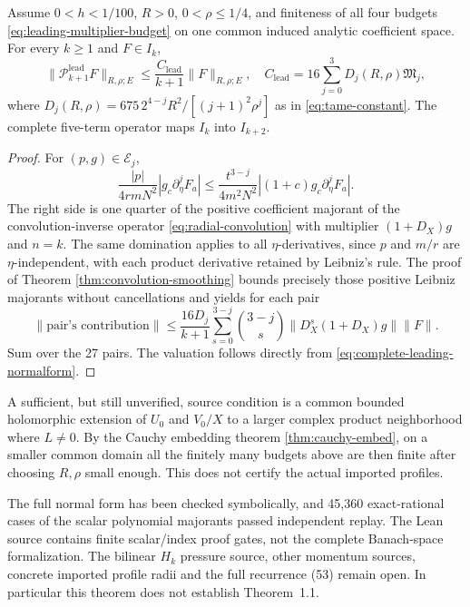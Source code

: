 \begin{theorem}
\label{thm:full-leading-pressure}
Assume $0<h<1/100$, $R>0$, $0<\rho\le1/4$,
and finiteness of all four budgets
\eqref{eq:leading-multiplier-budget} on one common induced
analytic coefficient space. For every $k\ge1$ and $F\in I_k$,
\begin{equation}\label{eq:leading-full-bound}
\|\mathcal P_{k+1}^{\mathrm{lead}}F\|_{R,\rho;E}
\le\frac{C_{\mathrm{lead}}}{k+1}\|F\|_{R,\rho;E},
\quad C_{\mathrm{lead}}=
16\sum_{j=0}^3D_j(R,\rho)\mathfrak M_j,
\end{equation}
where $D_j(R,\rho)=675\,2^{4-j}R^2/
[(j+1)^2\rho^j]$ as in \eqref{eq:tame-constant}.
The complete five-term operator maps $I_k$ into $I_{k+2}$.
\end{theorem}
\begin{proof}
For $(p,g)\in\mathcal E_j$,
\[
\frac{|p|}{4rmN^2}|g_c\partial_\eta^jF_a|
\le\frac{t^{3-j}}{4m^2N^2}
|(1+c)g_c\partial_\eta^jF_a|.
\]
The right side is one quarter of the positive coefficient
majorant of the convolution-inverse operator
\eqref{eq:radial-convolution} with multiplier
$(1+D_X)g$ and $n=k$. The same domination applies
to all $\eta$-derivatives, since $p$ and $m/r$ are
$\eta$-independent, with each product derivative retained
by Leibniz's rule. The proof of Theorem
\ref{thm:convolution-smoothing} bounds precisely those
positive Leibniz majorants without cancellations and yields
for each pair
\[
\|\text{pair's contribution}\|
\le\frac{16D_j}{k+1}
\sum_{s=0}^{3-j}\binom{3-j}{s}
\|D_X^s(1+D_X)g\|\|F\|.
\]
Sum over the 27 pairs. The valuation follows
directly from \eqref{eq:complete-leading-normalform}.
\end{proof}

A sufficient, but still unverified, source condition is a
common bounded holomorphic extension of $U_0$ and $V_0/X$
to a larger complex product neighborhood where $L\ne0$.
By the Cauchy embedding theorem \ref{thm:cauchy-embed},
on a smaller common domain all the finitely many budgets
above are then finite after choosing $R,\rho$ small enough.
This does not certify the actual imported profiles.

The full normal form has been checked symbolically, and
45,360 exact-rational cases of the scalar polynomial
majorants passed independent replay. The Lean source
contains finite scalar/index proof gates, not the complete
Banach-space formalization. The bilinear $H_k$ pressure
source, other momentum sources, concrete imported profile
radii and the full recurrence (53) remain open. In
particular this theorem does not establish Theorem~1.1.
